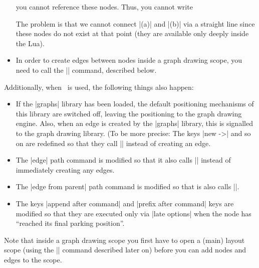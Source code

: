 \begin{command}{\pgfgdbeginscope}
\begin{itemize}
            you cannot reference these nodes. Thus, you cannot write
\begin{codeexample}
\end{codeexample}
            The problem is that we cannot connect |(a)| and |(b)| via a
            straight line since these nodes do not exist at that point (they
            are available only deeply inside the Lua).
        \item In order to create edges between nodes inside a graph drawing
            scope, you need to call the |\pgfgdedge| command, described below.
    \end{itemize}

    Additionally, when \tikzname\ is used, the following things also happen:
    \begin{itemize}
        \item If the |graphs| library has been loaded, the default positioning
            mechanisms of this library are switched off, leaving the
            positioning to the graph drawing engine. Also, when an edge is
            created by the |graphs| library, this is signalled to the graph
            drawing library. (To be more precise: The keys |new ->| and so on
            are redefined so that they call |\pgfgdedge| instead of creating an
            edge.
        \item The |edge| path command is modified so that it also calls
            |\pgfgdedge| instead of immediately creating any edges.
        \item The |edge from parent| path command is modified so that is also
            calls |\pgfgdedge|.
        \item The keys |append after command| and |prefix after command| keys
            are modified so that they are executed only via |late options| when
            the node has ``reached its final parking position''.
    \end{itemize}

    Note that inside a graph drawing scope you first have to open a (main)
    layout scope (using the |\pgfgdbeginlayout| command described later on)
    before you can add nodes and edges to the scope.
\end{command}

